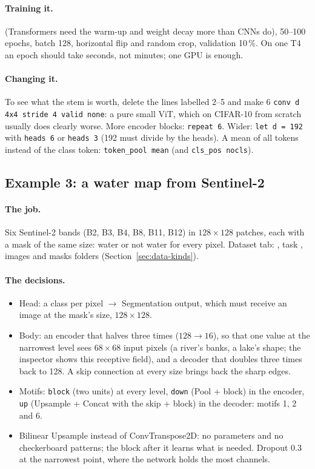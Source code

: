 \paragraph{Training it.}  (Transformers need the warm-up and weight decay more than CNNs do), 50--100 epochs,
batch 128, horizontal flip and random crop, validation 10\,\%. On one T4 an epoch should take seconds, not minutes; one GPU is enough.

\paragraph{Changing it.} To see what the stem is worth, delete the lines labelled 2--5 and make 6 \texttt{conv d 4x4 stride 4 valid none}: a
pure small ViT, which on CIFAR-10 from scratch usually does clearly worse. More encoder blocks: \texttt{repeat 6}. Wider: \texttt{let d
= 192} with \texttt{heads 6} or \texttt{heads 3} (192 must divide by the heads). A mean of all tokens instead of the class token:
\texttt{token\_pool mean} (and \texttt{cls\_pos nocls}).

\subsection{Example 3: a water map from Sentinel-2}
\label{sec:build-ex3}
\paragraph{The job.} Six Sentinel-2 bands (B2, B3, B4, B8, B11, B12) in $128\times128$ patches, each with a mask of the same size:
water or not water for every pixel. Dataset tab: , task , images and masks folders
(Section~\ref{sec:data-kinds}).

\paragraph{The decisions.}
\begin{itemize}[nosep]
  \item Head: a class per pixel $\rightarrow$ Segmentation output, which must receive an image at the mask's size, $128\times128$.
  \item Body: an encoder that halves three times ($128 \rightarrow 16$), so that one value at the narrowest level sees $68\times68$ input
        pixels (a river's banks, a lake's shape; the inspector shows this receptive field), and a decoder that doubles three times back to 128. A skip connection at every size
        brings back the sharp edges.
  \item Motifs: \texttt{block} (two units) at every level, \texttt{down} (Pool + block) in the encoder, \texttt{up} (Upsample +
        Concat with the skip + block) in the decoder: motifs 1, 2 and 6.
  \item Bilinear Upsample instead of ConvTranspose2D: no parameters and no checkerboard patterns; the block after it learns what
        is needed. Dropout 0.3 at the narrowest point, where the network holds the most channels.
\end{itemize}

